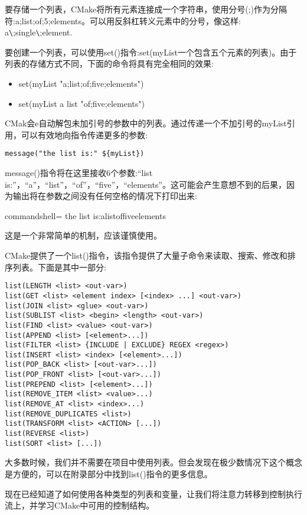 要存储一个列表，CMake将所有元素连接成一个字符串，使用分号(;)作为分隔符:a;list;of;5;elements。可以用反斜杠转义元素中的分号，像这样: a\verb|\|;single\verb|\|;element.

要创建一个列表，可以使用set()指令:set(myList一个包含五个元素的列表)。由于列表的存储方式不同，下面的命令将具有完全相同的效果:

\begin{itemize}
\item 
set(myList "a;list;of;five;elements")

\item 
set(myList a list "of;five;elements")
\end{itemize}

CMak会e自动解包未加引号的参数中的列表。通过传递一个不加引号的myList引用，可以有效地向指令传递更多的参数:

\begin{lstlisting}[style=styleCMake]
message("the list is:" ${myList})
\end{lstlisting}

message()指令将在这里接收6个参数:“list is:”，“a”，“list”，“of”，“five”，“elements”。这可能会产生意想不到的后果，因为输出将在参数之间没有任何空格的情况下打印出来:

\begin{tcblisting}{commandshell={}}
the list is:alistoffiveelements
\end{tcblisting}

这是一个非常简单的机制，应该谨慎使用。

CMake提供了一个list()指令，该指令提供了大量子命令来读取、搜索、修改和排序列表。下面是其中一部分:

\begin{lstlisting}[style=styleCMake]
list(LENGTH <list> <out-var>)
list(GET <list> <element index> [<index> ...] <out-var>)
list(JOIN <list> <glue> <out-var>)
list(SUBLIST <list> <begin> <length> <out-var>)
list(FIND <list> <value> <out-var>)
list(APPEND <list> [<element>...])
list(FILTER <list> {INCLUDE | EXCLUDE} REGEX <regex>)
list(INSERT <list> <index> [<element>...])
list(POP_BACK <list> [<out-var>...])
list(POP_FRONT <list> [<out-var>...])
list(PREPEND <list> [<element>...])
list(REMOVE_ITEM <list> <value>...)
list(REMOVE_AT <list> <index>...)
list(REMOVE_DUPLICATES <list>)
list(TRANSFORM <list> <ACTION> [...])
list(REVERSE <list>)
list(SORT <list> [...])
\end{lstlisting}

大多数时候，我们并不需要在项目中使用列表。但会发现在极少数情况下这个概念是方便的，可以在附录部分中找到list()指令的更多信息。

现在已经知道了如何使用各种类型的列表和变量，让我们将注意力转移到控制执行流上，并学习CMake中可用的控制结构。



















